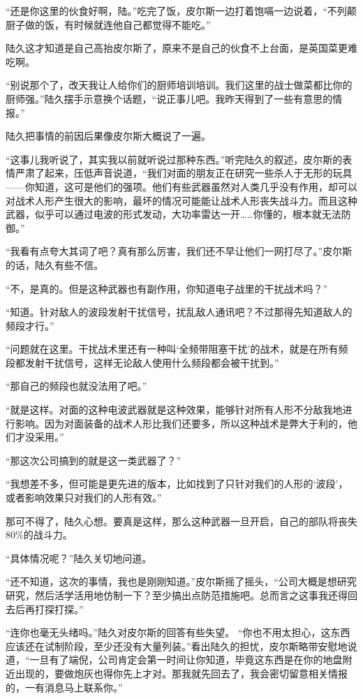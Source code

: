 “还是你这里的伙食好啊，陆。”吃完了饭，皮尔斯一边打着饱嗝一边说着，“不列颠厨子做的饭，有时候就连他自己都觉得不能吃。”

陆久这才知道是自己高抬皮尔斯了，原来不是自己的伙食不上台面，是英国菜更难吃啊。

“别说那个了，改天我让人给你们的厨师培训培训。我们这里的战士做菜都比你的厨师强。”陆久摆手示意换个话题，“说正事儿吧。我昨天得到了一些有意思的情报。”

陆久把事情的前因后果像皮尔斯大概说了一遍。

“这事儿我听说了，其实我以前就听说过那种东西。”听完陆久的叙述，皮尔斯的表情严肃了起来，压低声音说道，“我们对面的朋友正在研究一些杀人于无形的玩具——你知道，这可是他们的强项。他们有些武器虽然对人类几乎没有作用，却可以对战术人形产生很大的影响，最坏的情况可能能让战术人形丧失战斗力。而且这种武器，似乎可以通过电波的形式发动，大功率雷达一开……你懂的，根本就无法防御。”

“我看有点夸大其词了吧？真有那么厉害，我们还不早让他们一网打尽了。”皮尔斯的话，陆久有些不信。

“不，是真的。但是这种武器也有副作用，你知道电子战里的干扰战术吗？”

“知道。针对敌人的波段发射干扰信号，扰乱敌人通讯吧？不过那得先知道敌人的频段才行。”

“问题就在这里。干扰战术里还有一种叫‘全频带阻塞干扰’的战术，就是在所有频段都发射干扰信号，这样无论敌人使用什么频段都会被干扰到。”

“那自己的频段也就没法用了吧。”

“就是这样。对面的这种电波武器就是这种效果，能够针对所有人形不分敌我地进行影响。因为对面装备的战术人形比我们还要多，所以这种战术是弊大于利的，他们才没采用。”

“那这次公司搞到的就是这一类武器了？”

“我想差不多，但可能是更先进的版本，比如找到了只针对我们的人形的‘波段’，或者影响效果只对我们的人形有效。”

那可不得了，陆久心想。要真是这样，那么这种武器一旦开启，自己的部队将丧失$80\%$的战斗力。

“具体情况呢？”陆久关切地问道。

“还不知道，这次的事情，我也是刚刚知道。”皮尔斯摇了摇头，“公司大概是想研究研究，然后活学活用地仿制一下？至少搞出点防范措施吧。总而言之这事我还得回去后再打探打探。”

“连你也毫无头绪吗。”陆久对皮尔斯的回答有些失望。
“你也不用太担心，这东西应该还在试制阶段，至少还没有大量列装。”看出陆久的担忧，皮尔斯略带安慰地说道，“一旦有了端倪，公司肯定会第一时间让你知道，毕竟这东西是在你的地盘附近出现的，要做炮灰也得你先上才对。那我就先回去了，我会密切留意相关情报的，一有消息马上联系你。”

